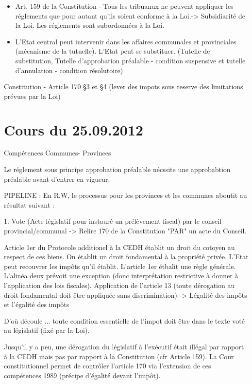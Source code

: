\documentclass{book}
\begin{document}
\begin{itemize}
\item Art. 159 de la Constitution - Tous les tribuanux ne peuvent appliquer les réglements que pour autant qu'ils soient conforme à la Loi.-> Subsidiarité de la Loi. Les réglements sont subordonnées à la Loi.
\item L'Etat central peut intervenir dans les affaires communales et provinciales (mécanisme de la tutuelle). L'Etat peut se substituer. (Tutelle de substitution, Tutelle d'approbation préalable - condition suspensive et tutelle d'annulation - condition résolutoire)
\end{itemize}

Constitution - Article 170 §3 et §4 (lever des impots sous reserve des limitations prévues par la Loi)

\chapter{Cours du 25.09.2012}

Compétences Communes- Provinces

Le réglement sous principe approbation préalable nécssite une approbabtion préalable avant d'entrer en vigueur.

PIPELINE : En R.W, le processus pour les provinces et les communes aboutit au résultat suivant :


1. Vote (Acte législatif pour instauré un prélèvement fiscal) par le conseil provincial/communal -> Relire 170 de la Constitution "PAR" un acte du Conseil.

Article 1er du Protocole additionel à la CEDH établit un droit du cotoyen au respect de ces biens. On établit un droit fondamental à la propriété privée. L'Etat peut recouvrer les impôts qu'il établit. L'article 1er étbalit une règle générale. L'alinéa deux prévoit une exception (donc interprétation restrictive à donner à l'application des lois fiscales). Application de l'article 13 (toute dérogation au droit fondamental doit être appliquée sans discrimination) -> Légalité des impôts et l'égalité des impôts

D'où découle ... toute condition essentielle de l'impot doit être dans le texte voté au législatif (fixé par la Loi).


Jusqu'il y a peu, une dérogation du législatif à l'exécutif était illégal par rapport à la CEDH mais pas par rapport à la Constitution (cfr Article 159). La Cour constitutionnel permet de contrôler l'article 170 via l'extension de ces compétences 1989 (précipe d'égalité devant l'impôt).
\end{document}

